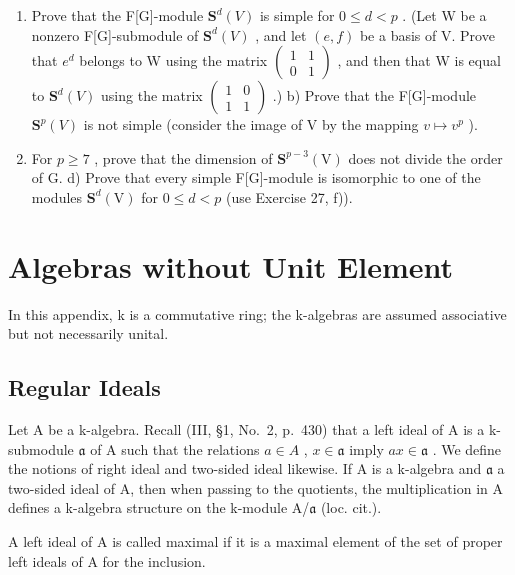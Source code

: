 \begin{enumerate}
\def\labelenumi{\alph{enumi})}
\item
  Prove that the F{[}G{]}-module \(\mathbf{S}^{d}(V)\) is simple for \(0 \leqslant d < p\) . (Let W be a nonzero F{[}G{]}-submodule of \(\mathbf{S}^{d}(V)\) , and let \((e, f)\) be a basis of V. Prove that \(e^{d}\) belongs to W using the matrix \(\begin{pmatrix}1 & 1 \\ 0 & 1\end{pmatrix}\) , and then that W is equal to \(\mathbf{S}^{d}(V)\) using the matrix \(\begin{pmatrix}1 & 0 \\ 1 & 1\end{pmatrix}\) .) b) Prove that the F{[}G{]}-module \(\mathbf{S}^{p}(V)\) is not simple (consider the image of V by the mapping \(v \mapsto v^{p}\) ).
\setcounter{enumi}{2}
\item
  For \(p \geqslant 7\) , prove that the dimension of \(\mathbf{S}^{p-3}(\mathrm{V})\) does not divide the order of G. d) Prove that every simple F{[}G{]}-module is isomorphic to one of the modules \(\mathbf{S}^{d}(\mathrm{V})\) for \(0 \leqslant d < p\) (use Exercise 27, f)).
\end{enumerate}

\appendix
\renewcommand{\thechapter}{\arabic{chapter}}
\chapter{Algebras without Unit Element}

In this appendix, k is a commutative ring; the k-algebras are assumed associative but not necessarily unital.

\section{Regular Ideals}

Let A be a k-algebra. Recall (III, §1, No.~2, p.~430) that a left ideal of A is a k-submodule \(\mathfrak{a}\) of A such that the relations \(a \in A\) , \(x \in \mathfrak{a}\) imply \(ax \in \mathfrak{a}\) . We define the notions of right ideal and two-sided ideal likewise. If A is a k-algebra and \(\mathfrak{a}\) a two-sided ideal of A, then when passing to the quotients, the multiplication in A defines a k-algebra structure on the k-module A/\(\mathfrak{a}\) (loc. cit.).

A left ideal of A is called maximal if it is a maximal element of the set of proper left ideals of A for the inclusion.

